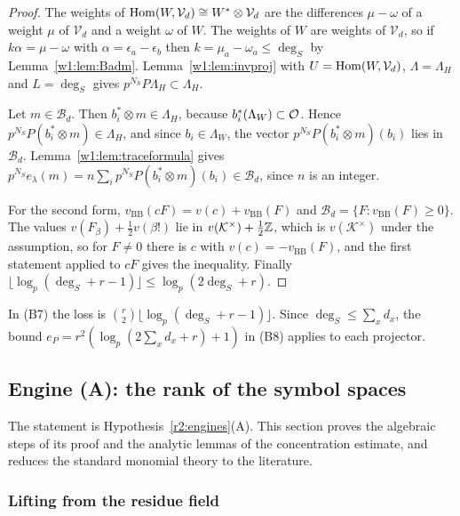 \begin{proof}
The weights of $\operatorname{Hom}(W,\mathcal V_d)\cong W^*\otimes\mathcal V_d$ are the differences $\mu-\omega$ of a weight $\mu$ of $\mathcal V_d$ and a weight $\omega$ of $W$. The weights of $W$ are weights of $\mathcal V_d$, so if $k\alpha=\mu-\omega$ with $\alpha=\epsilon_a-\epsilon_b$ then $k=\mu_a-\omega_a\le\deg_S$ by Lemma~\ref{w1:lem:Badm}. Lemma~\ref{w1:lem:invproj} with $U=\operatorname{Hom}(W,\mathcal V_d)$, $\Lambda=\Lambda_H$ and $L=\deg_S$ gives $p^{N_S}P\Lambda_H\subset\Lambda_H$.

Let $m\in\mathcal B_d$. Then $b_i^*\otimes m\in\Lambda_H$, because $b_i^*(\Lambda_W)\subset\mathcal O$. Hence $p^{N_S}P(b_i^*\otimes m)\in\Lambda_H$, and since $b_i\in\Lambda_W$, the vector $p^{N_S}P(b_i^*\otimes m)(b_i)$ lies in $\mathcal B_d$. Lemma~\ref{w1:lem:traceformula} gives $p^{N_S}e_\lambda(m)=n\sum_ip^{N_S}P(b_i^*\otimes m)(b_i)\in\mathcal B_d$, since $n$ is an integer.

For the second form, $v_{\mathrm{BB}}(cF)=v(c)+v_{\mathrm{BB}}(F)$ and $\mathcal B_d=\{F:v_{\mathrm{BB}}(F)\ge0\}$. The values $v(F_\beta)+\frac12v(\beta!)$ lie in $v(\mathcal K^\times)+\frac12\mathbb Z$, which is $v(\mathcal K^\times)$ under the assumption, so for $F\ne0$ there is $c$ with $v(c)=-v_{\mathrm{BB}}(F)$, and the first statement applied to $cF$ gives the inequality. Finally $\lfloor\log_p(\deg_S+r-1)\rfloor\le\log_p(2\deg_S+r)$.
\end{proof}

\begin{remark}\label{w1:rem:B7audit}
In (B7) the loss is $\binom r2\lfloor\log_p(\deg_S+r-1)\rfloor$. Since $\deg_S\le\sum_xd_x$, the bound $e_P=r^2(\log_p(2\sum_xd_x+r)+1)$ in (B8) applies to each projector.
\end{remark}



\subsection{Engine (A): the rank of the symbol spaces}\label{w1:sec:A}

The statement is Hypothesis~\ref{r2:engines}(A). This section proves the algebraic steps of its proof and the analytic lemmas of the concentration estimate, and reduces the standard monomial theory to the literature.

\subsubsection{Lifting from the residue field}

